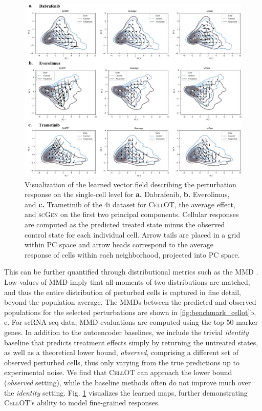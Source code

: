  \begin{figure}
     \centering
     \includegraphics[width=\textwidth]{figures/fig_4i_vector_fields.pdf}
     \caption{Visualization of the learned vector field describing the perturbation response on the single-cell level for \textbf{a.} Dabrafenib, \textbf{b.} Everolimus, and \textbf{c.} Trametinib of the 4i dataset for \textsc{CellOT}, the average effect, and \textsc{scGen} on the first two principal components. Cellular responses are computed as the predicted treated state minus the observed control state for each individual cell. Arrow tails are placed in a grid within PC space and arrow heads correspond to the average response of cells within each neighborhood, projected into PC space.}
     \label{fig:4i_vector_fields}
 \end{figure}

 This can be further quantified %
through distributional metrics such as the \acrfull{MMD} \citep{gretton2012kernel}.
Low values of \acrshort{MMD} imply that all moments of two distributions are matched, and thus the entire distribution of perturbed cells is captured in fine detail, beyond the population average.
The \acrshort{MMD}s between the predicted and observed populations for the selected perturbations are shown in \cref{fig:benchmark_cellot}b, e.
For scRNA-seq data, \acrshort{MMD} evaluations are computed using the top 50 marker genes.
In addition to the autoencoder baselines, we include the trivial \emph{identity} baseline that predicts treatment effects simply by returning the untreated states,
as well as a theoretical lower bound, \emph{observed}, comprising a different set of observed perturbed cells, thus only varying from the true predictions up to experimental noise.
We find that \textsc{CellOT} can approach the lower bound (\emph{observed} setting), while the baseline methods often do not improve much over the \emph{identity} setting.
Fig. \ref{fig:4i_vector_fields} visualizes the learned maps, %
further demonstrating \textsc{CellOT}'s ability to model fine-grained responses.


